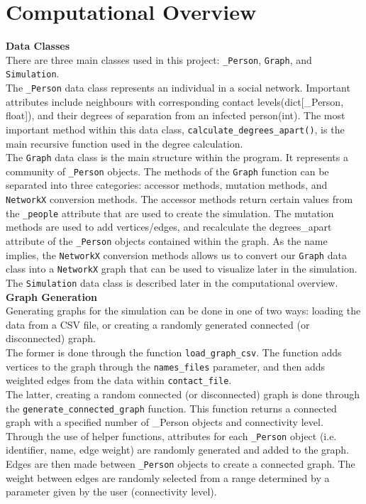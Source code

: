 \documentclass[fontsize=11pt]{article}
\newcommand{\ttt}[1]{\texttt{#1}}
\begin{document}
\section*{Computational Overview}
\textbf{Data Classes}\\
There are three main classes used in this project: \ttt{\_Person}, \ttt{Graph}, and \ttt{Simulation}.\\
\newline
The \ttt{\_Person} data class represents an individual in a social network. Important attributes include neighbours with corresponding contact levels(dict[\_Person, float]), and their degrees of separation from an infected person(int). The most important method within this data class, \ttt{calculate\_degrees\_apart()}, is the main recursive function used in the degree calculation. \\
\newline
\noindent
The \ttt{Graph} data class is the main structure within the program. It represents a community of \ttt{\_Person} objects. The methods of the \ttt{Graph} function can be separated into three categories: accessor methods, mutation methods, and \ttt{NetworkX} conversion methods. The accessor methods return certain values from the \ttt{\_people} attribute that are used to create the simulation. The mutation methods are used to add vertices/edges, and recalculate the degrees\_apart attribute of the \ttt{\_Person} objects contained within the graph. As the name implies, the \ttt{NetworkX} conversion methods allows us to convert our \ttt{Graph} data class into a \ttt{NetworkX} graph that can be used to visualize later in the simulation.\\
\newline
\noindent
The \ttt{Simulation} data class is described later in the computational overview.\\
\newline
\noindent
\textbf{Graph Generation}\\
Generating graphs for the simulation can be done in one of two ways: loading the data from a CSV file, or creating a randomly generated connected (or disconnected) graph.\\
\newline
The former is done through the function \ttt{load\_graph\_csv}. The function adds vertices to the graph through the \ttt{names\_files} parameter, and then adds weighted edges from the data within \ttt{contact\_file}.\\
\newline
The latter, creating a random connected (or disconnected) graph is done through the \ttt{generate\_connected\_graph} function. This function returns a connected graph with a specified number of \_Person objects and connectivity level. Through the use of helper functions, attributes for each \ttt{\_Person} object (i.e. identifier, name, edge weight) are randomly generated and added to the graph. Edges are then made between \ttt{\_Person} objects to create a connected graph. The weight between edges are randomly selected from a range determined by a parameter given by the user (connectivity level). \\
\end{document}
